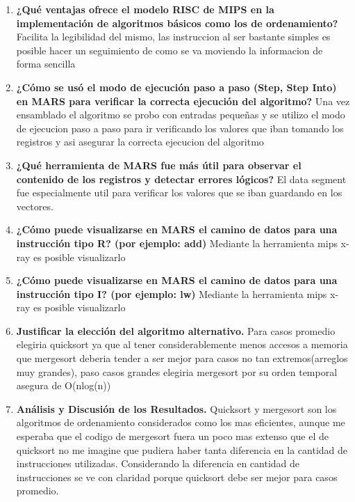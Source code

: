 \documentclass{article}
\begin{document}
\begin{enumerate}
    \item \textbf{¿Qué ventajas ofrece el modelo RISC de MIPS en la implementación de algoritmos básicos como los de ordenamiento?}
    Facilita la legibilidad del mismo, las instruccion al ser bastante simples es posible hacer un seguimiento de como se va moviendo la informacion de forma sencilla
    
    
    \item \textbf{¿Cómo se usó el modo de ejecución paso a paso (Step, Step Into) en MARS para verificar la correcta ejecución del algoritmo?}
    Una vez ensamblado el algoritmo se probo con entradas pequeñas y se utilizo el modo de ejecucion paso a paso para ir verificando los valores que iban tomando los registros y asi asegurar la correcta ejecucion del algoritmo
    
    \item \textbf{¿Qué herramienta de MARS fue más útil para observar el contenido de los registros y detectar errores lógicos?}
    El data segment fue especialmente util para verificar los valores que se iban guardando en los vectores.
    
    \item \textbf{¿Cómo puede visualizarse en MARS el camino de datos para una instrucción tipo R? (por ejemplo: add)}
    Mediante la herramienta mips x-ray es posible visualizarlo
    \item \textbf{¿Cómo puede visualizarse en MARS el camino de datos para una instrucción tipo I? (por ejemplo: lw)}
     Mediante la herramienta mips x-ray es posible visualizarlo
    \item \textbf{Justificar la elección del algoritmo alternativo.}
    Para casos promedio elegiria quicksort ya que al tener considerablemente menos accesos a memoria que mergesort deberia tender a ser mejor para casos no tan extremos(arreglos muy grandes), paso casos grandes elegiria mergesort por su orden temporal asegura de O(nlog(n))
    \item \textbf{Análisis y Discusión de los Resultados.}
    Quicksort y mergesort son los algoritmos de ordenamiento considerados como los mas eficientes, aunque me esperaba que el codigo de mergesort fuera un poco mas extenso que el de quicksort no me imagine que pudiera haber tanta diferencia en la cantidad de instrucciones utilizadas. Considerando la diferencia en cantidad de instrucciones se ve con claridad porque quicksort debe ser mejor para casos promedio.
\end{enumerate}
\end{document}
